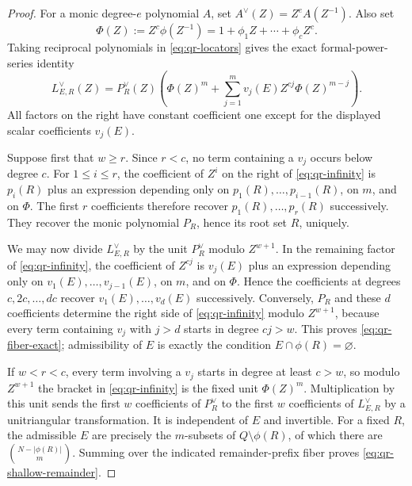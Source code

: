 \documentclass[11pt,a4paper]{amsart}
\numberwithin{equation}{section}
\theoremstyle{remark}
\begin{document}
\begin{proof}
For a monic degree-$e$ polynomial $A$, set
\(A^\vee(Z)=Z^eA(Z^{-1})\).  Also set
\[
       \Phi(Z):=Z^c\phi(Z^{-1})
       =1+\phi_1Z+\cdots+\phi_cZ^c.
\]
Taking reciprocal polynomials in \eqref{eq:qr-locators} gives the exact
formal-power-series identity
\[
 L_{E,R}^\vee(Z)=P_R^\vee(Z)
 \left(
   \Phi(Z)^m+
   \sum_{j=1}^m v_j(E)Z^{cj}\Phi(Z)^{m-j}
 \right).                                          \tag{QR5}\label{eq:qr-infinity}
\]
All factors on the right have constant coefficient one except for the
displayed scalar coefficients $v_j(E)$.

Suppose first that $w\ge r$.  Since $r<c$, no term containing a $v_j$
occurs below degree $c$.  For $1\le i\le r$, the coefficient of $Z^i$
on the right of \eqref{eq:qr-infinity} is
\(p_i(R)\) plus an expression depending only on
\(p_1(R),\ldots,p_{i-1}(R)\), on $m$, and on $\Phi$.  The first $r$
coefficients therefore recover $p_1(R),\ldots,p_r(R)$ successively.
They recover the monic polynomial $P_R$, hence its root set $R$, uniquely.

We may now divide \(L_{E,R}^\vee\) by the unit
\(P_R^\vee\) modulo $Z^{w+1}$.  In the remaining factor of
\eqref{eq:qr-infinity}, the coefficient of $Z^{cj}$ is
\(v_j(E)\) plus an expression depending only on
\(v_1(E),\ldots,v_{j-1}(E)\), on $m$, and on $\Phi$.  Hence the
coefficients at degrees $c,2c,\ldots,dc$ recover
\(v_1(E),\ldots,v_d(E)\) successively.  Conversely, $P_R$ and these $d$
coefficients determine the right side of \eqref{eq:qr-infinity} modulo
$Z^{w+1}$, because every term containing $v_j$ with $j>d$ starts in degree
$cj>w$.  This proves \eqref{eq:qr-fiber-exact}; admissibility of $E$ is
exactly the condition $E\cap\phi(R)=\varnothing$.

If $w<r<c$, every term involving a $v_j$ starts in degree at least
$c>w$, so modulo $Z^{w+1}$ the bracket in \eqref{eq:qr-infinity} is the
fixed unit $\Phi(Z)^m$.  Multiplication by this unit sends the first $w$
coefficients of $P_R^\vee$ to the first $w$ coefficients of
$L_{E,R}^\vee$ by a unitriangular transformation.  It is independent of
$E$ and invertible.  For a fixed $R$, the admissible $E$ are precisely the
$m$-subsets of $Q\setminus\phi(R)$, of which there are
\(\binom{N-|\phi(R)|}{m}\).  Summing over the indicated remainder-prefix
fiber proves \eqref{eq:qr-shallow-remainder}.
\end{proof}
\end{document}
